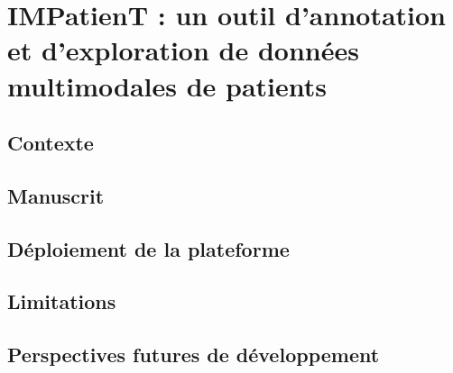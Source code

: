 \chapter{IMPatienT : un outil d’annotation et d’exploration de données multimodales de patients}

\section{Contexte}
\section{Manuscrit}

\section{Déploiement de la plateforme}
\section{Limitations}
\section{Perspectives futures de développement}
